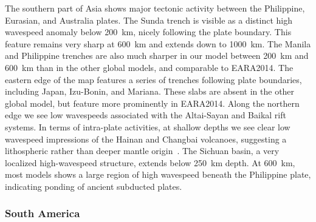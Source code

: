 \documentclass[extra,mreferee]{gji}
\begin{document}
The southern part of Asia shows major tectonic activity between the
Philippine, Eurasian, and Australia plates.
The Sunda trench is visible as a distinct high wavespeed anomaly below 200~km,
nicely following the plate boundary.
This feature remains very sharp at 600~km and extends
down to 1000~km.
The Manila and Philippine trenches are also much sharper in our model between 200~km and
600~km than in the other global models, and comparable to EARA2014.
The eastern edge of the map features a series of trenches following plate boundaries,
including Japan, Izu-Bonin, and Mariana.
These slabs are absent in the other global model,
but feature more prominently in EARA2014.
Along the northern edge we see low wavespeeds associated with the
Altai-Sayan and Baikal rift systems.
In terms of intra-plate activities,
at shallow depths we see clear low wavespeed impressions of the Hainan and Changbai volcanoes,
suggesting a lithospheric rather than deeper mantle origin~\citep{yin2000geologic}.
The Sichuan basin, a very localized high-wavespeed structure, extends below
250~km depth. At 600~km, most models shows a large region of high wavespeed
beneath the Philippine plate, indicating ponding of ancient subducted plates.

\subsubsection{South America}
\end{document}
